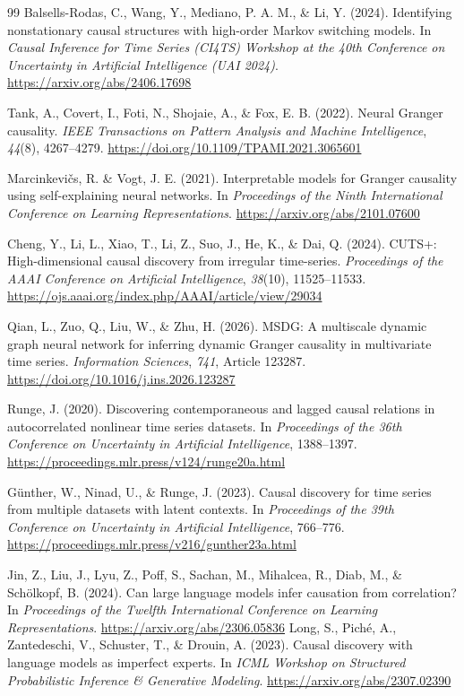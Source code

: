 \begin{thebibliography}{99}
 Balsells-Rodas, C., Wang, Y., Mediano, P. A. M., \& Li, Y. (2024). Identifying nonstationary causal structures with high-order Markov switching models. In \textit{Causal Inference for Time Series (CI4TS) Workshop at the 40th Conference on Uncertainty in Artificial Intelligence (UAI 2024)}. \url{https://arxiv.org/abs/2406.17698}

 Tank, A., Covert, I., Foti, N., Shojaie, A., \& Fox, E. B. (2022). Neural Granger causality. \textit{IEEE Transactions on Pattern Analysis and Machine Intelligence}, \textit{44}(8), 4267--4279. \url{https://doi.org/10.1109/TPAMI.2021.3065601}

 Marcinkevi{\v{c}}s, R. \& Vogt, J. E. (2021). Interpretable models for Granger causality using self-explaining neural networks. In \textit{Proceedings of the Ninth International Conference on Learning Representations}. \url{https://arxiv.org/abs/2101.07600}

 Cheng, Y., Li, L., Xiao, T., Li, Z., Suo, J., He, K., \& Dai, Q. (2024). CUTS+: High-dimensional causal discovery from irregular time-series. \textit{Proceedings of the AAAI Conference on Artificial Intelligence}, \textit{38}(10), 11525--11533. \url{https://ojs.aaai.org/index.php/AAAI/article/view/29034}

 Qian, L., Zuo, Q., Liu, W., \& Zhu, H. (2026). MSDG: A multiscale dynamic graph neural network for inferring dynamic Granger causality in multivariate time series. \textit{Information Sciences}, \textit{741}, Article 123287. \url{https://doi.org/10.1016/j.ins.2026.123287}

 Runge, J. (2020). Discovering contemporaneous and lagged causal relations in autocorrelated nonlinear time series datasets. In \textit{Proceedings of the 36th Conference on Uncertainty in Artificial Intelligence}, 1388--1397. \url{https://proceedings.mlr.press/v124/runge20a.html}

 G{\"u}nther, W., Ninad, U., \& Runge, J. (2023). Causal discovery for time series from multiple datasets with latent contexts. In \textit{Proceedings of the 39th Conference on Uncertainty in Artificial Intelligence}, 766--776. \url{https://proceedings.mlr.press/v216/gunther23a.html}

 Jin, Z., Liu, J., Lyu, Z., Poff, S., Sachan, M., Mihalcea, R., Diab, M., \& Sch{\"o}lkopf, B. (2024). Can large language models infer causation from correlation? In \textit{Proceedings of the Twelfth International Conference on Learning Representations}. \url{https://arxiv.org/abs/2306.05836}
 Long, S., Pich{\'e}, A., Zantedeschi, V., Schuster, T., \& Drouin, A. (2023). Causal discovery with language models as imperfect experts. In \textit{ICML Workshop on Structured Probabilistic Inference \& Generative Modeling}. \url{https://arxiv.org/abs/2307.02390}


\end{thebibliography}
